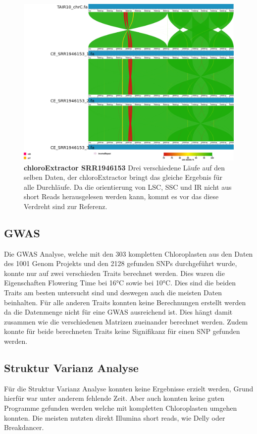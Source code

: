 \documentclass{scrartcl}
\begin{document}
\begin{figure}
\includegraphics[width=.9\linewidth]{./SRR1946153_CE_1.png}
\caption[chloroExtractor SRR1946153]{\textbf{chloroExtractor SRR1946153} Drei verschiedene Läufe auf den selben Daten, der chloroExtractor bringt das gleiche Ergebnis für alle Durchläufe. Da die orientierung von LSC, SSC und IR nicht aus short Reads herausgelesen werden kann, kommt es vor das diese Verdreht sind zur Referenz.}
\end{figure}
\subsection{GWAS}
\label{sec-4-8}
Die GWAS Analyse, welche mit den 303 kompletten Chloroplasten aus den Daten des 1001 Genom Projekts und den 2128 gefunden SNPs durchgeführt wurde, konnte nur auf zwei verschieden Traits berechnet werden. Dies waren 
die Eigenschaften Flowering Time bei 16°C sowie bei 10°C. Dies sind die beiden Traits am besten untersucht sind und deswegen auch die meisten Daten beinhalten. Für alle anderen Traits konnten
keine Berechnungen erstellt werden da die Datenmenge nicht für eine GWAS ausreichend ist. Dies hängt damit zusammen wie die verschiedenen Matrizen zueinander berechnet werden.
Zudem konnte für beide berechneten Traits keine Signifikanz für einen SNP gefunden werden.
\subsection{Struktur Varianz Analyse}
\label{sec-4-9}
Für die Struktur Varianz Analyse konnten keine Ergebnisse erzielt werden, Grund hierfür war unter anderem fehlende Zeit. Aber auch konnten keine guten Programme gefunden werden welche mit kompletten Chloroplasten
umgehen konnten. Die meisten nutzten direkt Illumina short reads, wie Delly\footnotemark[57]{} oder Breakdancer\footnotemark[56]{}. 
\end{document}
